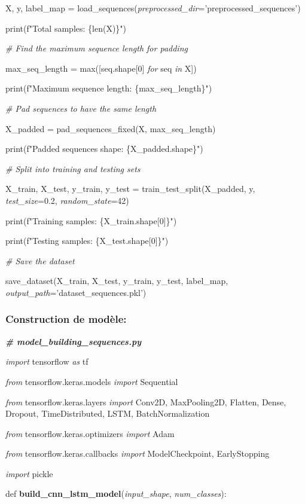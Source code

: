 \documentclass[
]{article}
\begin{document}
X, y, label\_map = load\_sequences(\emph{preprocessed\_dir}='preprocessed\_sequences')

print(f"Total samples: \{len(X)\}")

\emph{\# Find the maximum sequence length for padding}

max\_seq\_length = max({[}seq.shape{[}0{]} \emph{for} seq \emph{in} X{]})

print(f"Maximum sequence length: \{max\_seq\_length\}")

\emph{\# Pad sequences to have the same length}

X\_padded = pad\_sequences\_fixed(X, max\_seq\_length)

print(f"Padded sequences shape: \{X\_padded.shape\}")

\emph{\# Split into training and testing sets}

X\_train, X\_test, y\_train, y\_test = train\_test\_split(X\_padded, y, \emph{test\_size}=0.2, \emph{random\_state}=42)

print(f"Training samples: \{X\_train.shape{[}0{]}\}")

print(f"Testing samples: \{X\_test.shape{[}0{]}\}")

\emph{\# Save the dataset}

save\_dataset(X\_train, X\_test, y\_train, y\_test, label\_map, \emph{output\_path}='dataset\_sequences.pkl')

\hypertarget{construction-de-moduxe8le}{%
\subsubsection{Construction de modèle:}\label{construction-de-moduxe8le}}

\emph{\textbf{\# model\_building\_sequences.py}}

\emph{import} tensorflow \emph{as} tf

\emph{from} tensorflow.keras.models \emph{import} Sequential

\emph{from} tensorflow.keras.layers \emph{import} Conv2D, MaxPooling2D, Flatten, Dense, Dropout, TimeDistributed, LSTM, BatchNormalization

\emph{from} tensorflow.keras.optimizers \emph{import} Adam

\emph{from} tensorflow.keras.callbacks \emph{import} ModelCheckpoint, EarlyStopping

\emph{import} pickle

def \textbf{build\_cnn\_lstm\_model}(\emph{input\_shape}, \emph{num\_classes}):
\end{document}
